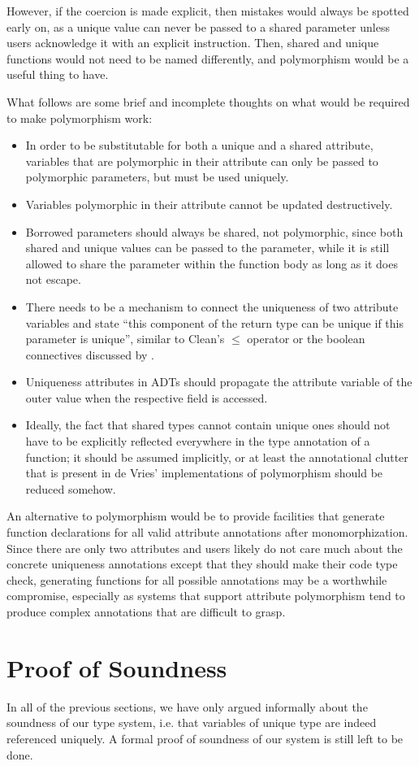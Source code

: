 However, if the coercion is made explicit, then mistakes would always be spotted early on, as a unique value can never be passed to a shared parameter unless users acknowledge it with an explicit instruction. Then, shared and unique functions would not need to be named differently, and polymorphism would be a useful thing to have.

What follows are some brief and incomplete thoughts on what would be required to make polymorphism work:
\begin{itemize}
	\item In order to be substitutable for both a unique and a shared attribute, variables that are polymorphic in their attribute can only be passed to polymorphic parameters, but must be used uniquely.
	\item Variables polymorphic in their attribute cannot be updated destructively.
	\item Borrowed parameters should always be shared, not polymorphic, since both shared and unique values can be passed to the parameter, while it is still allowed to share the parameter within the function body as long as it does not escape.
	\item There needs to be a mechanism to connect the uniqueness of two attribute variables and state ``this component of the return type can be unique if this parameter is unique'', similar to Clean's $\leq$ operator or the boolean connectives discussed by \cite{de_vries_making_2009}.
	\item Uniqueness attributes in ADTs should propagate the attribute variable of the outer value when the respective field is accessed.
	\item Ideally, the fact that shared types cannot contain unique ones should not have to be explicitly reflected everywhere in the type annotation of a function; it should be assumed implicitly, or at least the annotational clutter that is present in de Vries' implementations of polymorphism should be reduced somehow.
\end{itemize}

An alternative to polymorphism would be to provide facilities that generate function declarations for all valid attribute annotations after monomorphization. Since there are only two attributes and users likely do not care much about the concrete uniqueness annotations except that they should make their code type check, generating functions for all possible annotations may be a worthwhile compromise, especially as systems that support attribute polymorphism tend to produce complex annotations that are difficult to grasp.

\section{Proof of Soundness}
In all of the previous sections, we have only argued informally about the soundness of our type system, i.e. that variables of unique type are indeed referenced uniquely. A formal proof of soundness of our system is still left to be done.